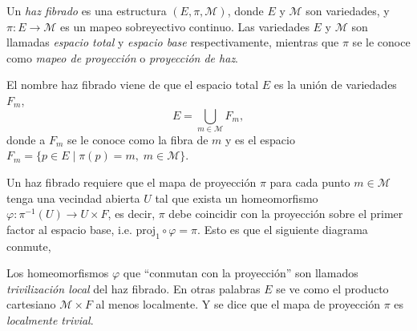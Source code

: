 
\begin{mydef} \cite{Baez}
Un \emph{haz fibrado} es una estructura $(E, \pi, \mathcal{M})$, donde $E$ y $\mathcal{M}$ son variedades, y $\pi: E \longrightarrow \mathcal{M}$ es un mapeo sobreyectivo continuo. Las variedades $E$ y $\mathcal{M}$ son llamadas \emph{espacio total} y \emph{espacio base} respectivamente, mientras que $\pi$ se le conoce como \emph{mapeo de proyecci\'{o}n} o \emph{proyecci\'{o}n de haz}.
%
\begin{center}
\end{center}
%
\end{mydef}

El nombre haz fibrado viene de que el espacio total $E$ es la uni\'{o}n de variedades $F_{m}$, $$E = \bigcup\limits_{m \in \mathcal{M}} F_{m},$$ donde a $F_{m}$ se le conoce como la fibra de $m$ y es el espacio $F_{m} = \{p \in E \; \vert \; \pi(p) = m, \; m \in \mathcal{M}\}$.

Un haz fibrado requiere que el mapa de proyecci\'{o}n $\pi$ para cada punto $m \in \mathcal{M}$ tenga una vecindad abierta $U$ tal que exista un homeomorfismo $\varphi: \pi^{-1}(U) \longrightarrow U \times F$, es decir, $\pi$ debe coincidir con la proyecci\'{o}n sobre el primer factor al espacio base, i.e. $\mathrm{proj_{1}} \circ \varphi = \pi$. Esto es que el siguiente diagrama conmute,
%
\begin{center}
\end{center}

Los homeomorfismos $\varphi$ que ``conmutan con la proyecci\'{o}n'' son llamados \emph{trivilizaci\'{o}n local} del haz fibrado. En otras palabras $E$ se ve como el producto cartesiano $\mathcal{M} \times F$ al menos localmente. Y se dice que el mapa de proyecci\'{o}n $\pi$ es \emph{localmente trivial}.

